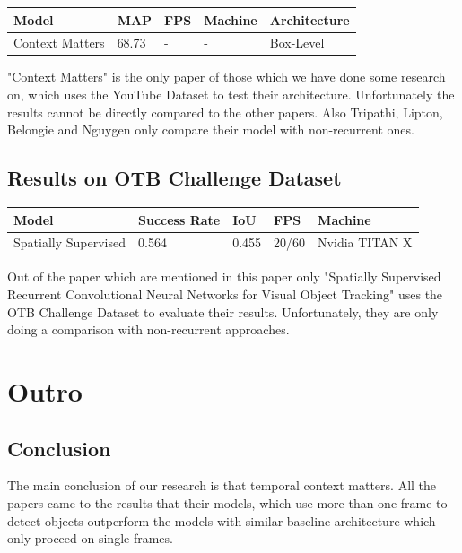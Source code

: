\documentclass[conference]{IEEEtran}
\begin{document}
\begin{tabular}{ | p{2cm} | p{2em}| p{2em} | p{4em} | p{5em} | } 
 \hline
 Model & MAP & FPS & Machine & Architecture \\
 \hline
 Context Matters \cite{b4} & 68.73 & - & - & Box-Level \\
 \hline
\end{tabular} \newline

"Context Matters" is the only paper of those which we have done some research on, which uses the YouTube Dataset to test their architecture. Unfortunately the results cannot be directly compared to the other papers. Also Tripathi, Lipton, Belongie and Nguygen only compare their model with non-recurrent ones. \newline

\subsection{Results on OTB Challenge Dataset}
\begin{tabular}{ | p{2cm} | p{3em}| p{2em} | p{4em} | p{4em} | } 
 \hline
 Model & Success Rate & IoU & FPS & Machine \\
 \hline
 Spatially Supervised \cite{b5} & 0.564 & 0.455 & 20/60 & Nvidia TITAN X \\
 \hline
\end{tabular} \newline

Out of the paper which are mentioned in this paper only "Spatially Supervised Recurrent Convolutional Neural Networks for Visual Object Tracking" uses the OTB Challenge Dataset to evaluate their results. Unfortunately, they are only doing a comparison with non-recurrent approaches. 

\section{Outro}

\subsection{Conclusion}
The main conclusion of our research is that temporal context matters. All the papers came to the results that their models, which use more than one frame to detect objects outperform the models with similar baseline architecture which only proceed on single frames. \newline
\end{document}
